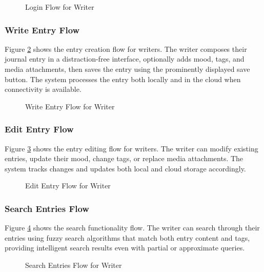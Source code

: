 \begin{figure}[H]
\centering

\caption{Login Flow for Writer}
\label{fig:login-flow}
\end{figure}

\subsubsection{Write Entry Flow}\label{subsubsec:writeEntryFlow}

Figure \ref{fig:write-entry-flow} shows the entry creation flow for writers. The writer composes their journal entry in a distraction-free interface, optionally adds mood, tags, and media attachments, then saves the entry using the prominently displayed save button. The system processes the entry both locally and in the cloud when connectivity is available.

\begin{figure}[H]
\centering

\caption{Write Entry Flow for Writer}
\label{fig:write-entry-flow}
\end{figure}

\subsubsection{Edit Entry Flow}\label{subsubsec:editEntryFlow}

Figure \ref{fig:edit-entry-flow} shows the entry editing flow for writers. The writer can modify existing entries, update their mood, change tags, or replace media attachments. The system tracks changes and updates both local and cloud storage accordingly.

\begin{figure}[H]
\centering

\caption{Edit Entry Flow for Writer}
\label{fig:edit-entry-flow}
\end{figure}

\subsubsection{Search Entries Flow}\label{subsubsec:searchFlow}

Figure \ref{fig:search-flow} shows the search functionality flow. The writer can search through their entries using fuzzy search algorithms that match both entry content and tags, providing intelligent search results even with partial or approximate queries.

\begin{figure}[H]
\centering

\caption{Search Entries Flow for Writer}
\label{fig:search-flow}
\end{figure}

